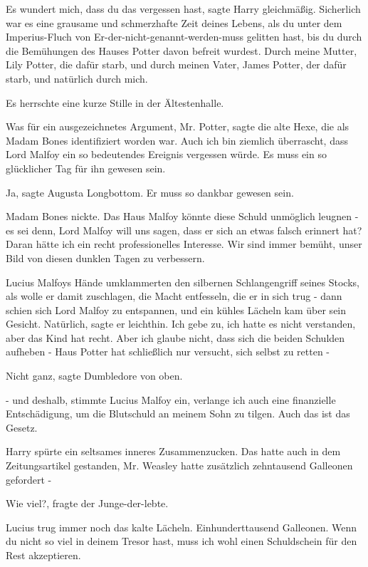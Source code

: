 \glqq Es wundert mich, dass du das vergessen hast\grqq{}, sagte Harry
gleichmäßig. \glqq Sicherlich war es eine grausame und schmerzhafte Zeit deines
Lebens, als du unter dem Imperius-Fluch von Er-der-nicht-genannt-werden-muss
gelitten hast, bis du durch die Bemühungen des Hauses Potter davon befreit
wurdest. Durch meine Mutter, Lily Potter, die dafür starb, und durch meinen
Vater, James Potter, der dafür starb, und natürlich durch mich.\grqq{}

Es herrschte eine kurze Stille in der Ältestenhalle.

\glqq Was für ein ausgezeichnetes Argument, Mr. Potter\grqq{}, sagte die alte
Hexe, die als Madam Bones identifiziert worden war. \glqq Auch ich bin ziemlich
überrascht, dass Lord Malfoy ein so bedeutendes Ereignis vergessen würde. Es
muss ein so glücklicher Tag für ihn gewesen sein.\grqq{}

\glqq Ja\grqq{}, sagte Augusta Longbottom. \glqq Er muss so dankbar gewesen
sein.\grqq{}

Madam Bones nickte. \glqq Das Haus Malfoy könnte diese Schuld unmöglich leugnen
- es sei denn, Lord Malfoy will uns sagen, dass er sich an etwas falsch erinnert
hat? Daran hätte ich ein recht professionelles Interesse. Wir sind immer bemüht,
unser Bild von diesen dunklen Tagen zu verbessern.\grqq{}

Lucius Malfoys Hände umklammerten den silbernen Schlangengriff seines Stocks,
als wolle er damit zuschlagen, die Macht entfesseln, die er in sich trug - dann
schien sich Lord Malfoy zu entspannen, und ein kühles Lächeln kam über sein
Gesicht. \glqq Natürlich\grqq{}, sagte er leichthin. \glqq Ich gebe zu, ich
hatte es nicht verstanden, aber das Kind hat recht. Aber ich glaube nicht, dass
sich die beiden Schulden aufheben - Haus Potter hat schließlich nur versucht,
sich selbst zu retten -\grqq{}

\glqq Nicht ganz\grqq{}, sagte Dumbledore von oben.

\glqq - und deshalb\grqq{}, stimmte Lucius Malfoy ein, \glqq verlange ich auch
eine finanzielle Entschädigung, um die Blutschuld an meinem Sohn zu tilgen. Auch
das ist das Gesetz.\grqq{}

Harry spürte ein seltsames inneres Zusammenzucken. Das hatte auch in dem
Zeitungsartikel gestanden, Mr. Weasley hatte zusätzlich zehntausend Galleonen
gefordert -

\glqq Wie viel?\grqq{}, fragte der Junge-der-lebte.

Lucius trug immer noch das kalte Lächeln. \glqq Einhunderttausend Galleonen.
Wenn du nicht so viel in deinem Tresor hast, muss ich wohl einen Schuldschein
für den Rest akzeptieren.\grqq{}


